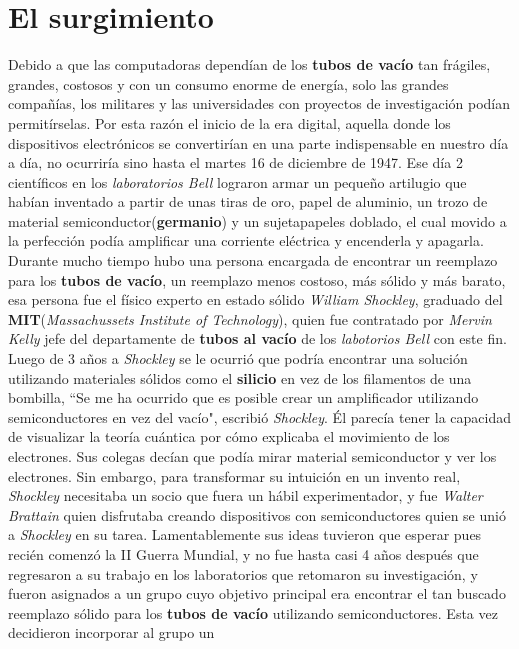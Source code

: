 \section{El surgimiento}
Debido a que las computadoras dependían de los \textbf{tubos de vacío} tan frágiles, grandes,
costosos y con un consumo enorme de energía, solo las grandes compañías, los militares y las
universidades con proyectos de investigación podían permitírselas. Por esta razón el inicio de la
era digital, aquella donde los dispositivos electrónicos se convertirían en una parte indispensable
en nuestro día a día, no ocurriría sino hasta el martes 16 de diciembre de 1947. Ese día 2 científicos
en los \emph{laboratorios Bell} lograron armar un pequeño artilugio que habían inventado a partir de
unas tiras de oro, papel de aluminio, un trozo de material semiconductor(\textbf{germanio}) y un sujetapapeles
doblado, el cual movido a la perfección podía amplificar una corriente eléctrica y encenderla y apagarla.\\
Durante mucho tiempo hubo una persona encargada de encontrar un reemplazo para los \textbf{tubos 
de vacío}, un reemplazo menos costoso, más sólido y más barato, esa persona fue el físico experto
en estado sólido \emph{William Shockley}, graduado del \textbf{MIT}(\emph{Massachussets Institute of Technology}),
quien fue contratado por \emph{Mervin Kelly} jefe del departamente de \textbf{tubos al vacío} de los \emph{
labotorios Bell} con este fin. Luego de 3 años a \emph{Shockley} se le ocurrió que podría encontrar una
solución utilizando materiales sólidos como el \textbf{silicio} en vez de los filamentos de una bombilla, “Se 
me ha ocurrido que es posible crear un amplificador utilizando semiconductores en vez del vacío",
escribió \emph{Shockley}. Él parecía tener la capacidad de visualizar la teoría cuántica por cómo explicaba
el movimiento de los electrones. Sus colegas decían que podía mirar material semiconductor y ver los
electrones. Sin embargo, para transformar su intuición en un invento real, \emph{Shockley} necesitaba
un socio que fuera un hábil experimentador, y fue \emph{Walter Brattain} quien disfrutaba creando
dispositivos con semiconductores quien se unió a \emph{Shockley} en su tarea. Lamentablemente sus
ideas tuvieron que esperar pues recién comenzó la II Guerra Mundial, y no fue hasta casi 4 años
después que regresaron a su trabajo en los laboratorios que retomaron su investigación, y fueron
asignados a un grupo cuyo objetivo principal era encontrar el tan buscado reemplazo sólido para
los \textbf{tubos de vacío} utilizando semiconductores. Esta vez decidieron incorporar al grupo un 
